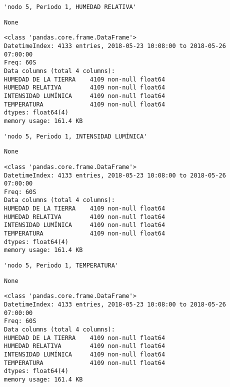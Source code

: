 \documentclass[11pt]{article}
\begin{document}
    
    \begin{verbatim}
'nodo 5, Periodo 1, HUMEDAD RELATIVA'
    \end{verbatim}

    
    
    \begin{verbatim}
None
    \end{verbatim}

    
    \begin{Verbatim}[commandchars=\\\{\}]
<class 'pandas.core.frame.DataFrame'>
DatetimeIndex: 4133 entries, 2018-05-23 10:08:00 to 2018-05-26 07:00:00
Freq: 60S
Data columns (total 4 columns):
HUMEDAD DE LA TIERRA    4109 non-null float64
HUMEDAD RELATIVA        4109 non-null float64
INTENSIDAD LUMÍNICA     4109 non-null float64
TEMPERATURA             4109 non-null float64
dtypes: float64(4)
memory usage: 161.4 KB

    \end{Verbatim}

    
    \begin{verbatim}
'nodo 5, Periodo 1, INTENSIDAD LUMÍNICA'
    \end{verbatim}

    
    
    \begin{verbatim}
None
    \end{verbatim}

    
    \begin{Verbatim}[commandchars=\\\{\}]
<class 'pandas.core.frame.DataFrame'>
DatetimeIndex: 4133 entries, 2018-05-23 10:08:00 to 2018-05-26 07:00:00
Freq: 60S
Data columns (total 4 columns):
HUMEDAD DE LA TIERRA    4109 non-null float64
HUMEDAD RELATIVA        4109 non-null float64
INTENSIDAD LUMÍNICA     4109 non-null float64
TEMPERATURA             4109 non-null float64
dtypes: float64(4)
memory usage: 161.4 KB

    \end{Verbatim}

    
    \begin{verbatim}
'nodo 5, Periodo 1, TEMPERATURA'
    \end{verbatim}

    
    
    \begin{verbatim}
None
    \end{verbatim}

    
    \begin{Verbatim}[commandchars=\\\{\}]
<class 'pandas.core.frame.DataFrame'>
DatetimeIndex: 4133 entries, 2018-05-23 10:08:00 to 2018-05-26 07:00:00
Freq: 60S
Data columns (total 4 columns):
HUMEDAD DE LA TIERRA    4109 non-null float64
HUMEDAD RELATIVA        4109 non-null float64
INTENSIDAD LUMÍNICA     4109 non-null float64
TEMPERATURA             4109 non-null float64
dtypes: float64(4)
memory usage: 161.4 KB

    \end{Verbatim}
\end{document}
